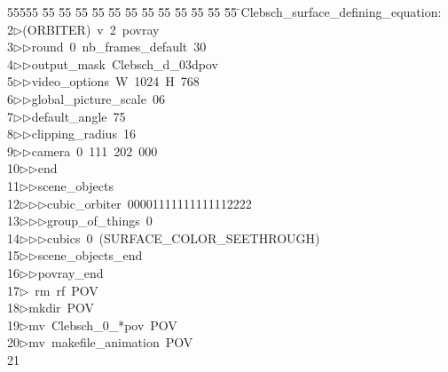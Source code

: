 %
%
\begin{tabbing}
55555 \= 55 \= 55 \= 55 \= 55 \= 55 \= 55 \= 55 \= 55 \= 55 \= 55 \= 55 \= 55 \= \>Clebsch\_surface\_defining\_equation:\\[0pt]
2\>$\triangleright$\>(ORBITER)\ v\ 2\ povray\ \\[0pt]
3\>$\triangleright$\>$\triangleright$\>round\ 0\ nb\_frames\_default\ 30\ \\[0pt]
4\>$\triangleright$\>$\triangleright$\>output\_mask\ Clebsch\_d\_03dpov\ \\[0pt]
5\>$\triangleright$\>$\triangleright$\>video\_options\ W\ 1024\ H\ 768\ \\[0pt]
6\>$\triangleright$\>$\triangleright$\>global\_picture\_scale\ 06\ \\[0pt]
7\>$\triangleright$\>$\triangleright$\>default\_angle\ 75\ \\[0pt]
8\>$\triangleright$\>$\triangleright$\>clipping\_radius\ 16\ \\[0pt]
9\>$\triangleright$\>$\triangleright$\>camera\ 0\ 111\ 202\ 000\ \\[0pt]
10\>$\triangleright$\>$\triangleright$\>end\ \\[0pt]
11\>$\triangleright$\>$\triangleright$\>scene\_objects\ \\[0pt]
12\>$\triangleright$\>$\triangleright$\>$\triangleright$\>cubic\_orbiter\ 00001111111111112222\ \\[0pt]
13\>$\triangleright$\>$\triangleright$\>$\triangleright$\>group\_of\_things\ 0\ \\[0pt]
14\>$\triangleright$\>$\triangleright$\>$\triangleright$\>cubics\ 0\ (SURFACE\_COLOR\_SEETHROUGH)\ \\[0pt]
15\>$\triangleright$\>$\triangleright$\>scene\_objects\_end\ \\[0pt]
16\>$\triangleright$\>$\triangleright$\>povray\_end\\[0pt]
17\>$\triangleright$\>\ rm\ rf\ POV\\[0pt]
18\>$\triangleright$\>mkdir\ POV\\[0pt]
19\>$\triangleright$\>mv\ Clebsch\_0\_*pov\ POV\\[0pt]
20\>$\triangleright$\>mv\ makefile\_animation\ POV\\[0pt]
21\>\end{tabbing}
